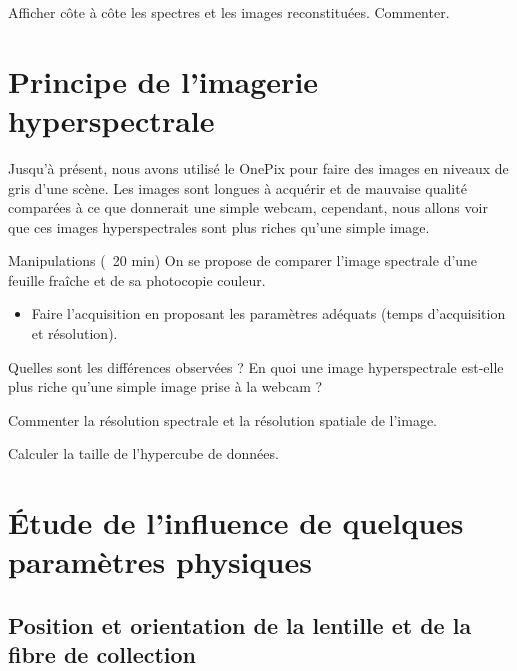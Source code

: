 \documentclass[a4paper,twoside,10pt]{book}
\begin{document}
\begin{question}[resume]
\item Afficher côte à côte les spectres et les images reconstituées. Commenter.
\end{question}



%
%
\section{Principe de l'imagerie hyperspectrale}

Jusqu'à présent, nous avons utilisé le OnePix pour faire des images en niveaux de gris d'une scène. Les images sont longues à acquérir et de mauvaise qualité comparées à ce que donnerait une simple webcam, cependant, nous allons voir que ces images hyperspectrales sont plus riches qu'une simple image.

\begin{bclogo}[noborder=true, logo = \bcoutil,barre = line]{Manipulations (\faClockO\ 20 min)}
On se propose de comparer l'image spectrale d'une feuille fraîche et de sa photocopie couleur.
\begin{itemize}[label=]
\item Faire l'acquisition en proposant les paramètres adéquats (temps d'acquisition et résolution).
\end{itemize}
\end{bclogo}

\begin{question}[resume]
\item Quelles sont les différences observées ? En quoi une image hyperspectrale est-elle plus
riche qu'une simple image prise à la webcam ?
\item Commenter la résolution spectrale et la résolution spatiale de l'image.
\item Calculer la taille de l’hypercube de données.
\end{question}


%
%
\section{Étude de l'influence de quelques paramètres physiques}

\subsection{Position et orientation de la lentille et de la fibre de collection}
\end{document}
